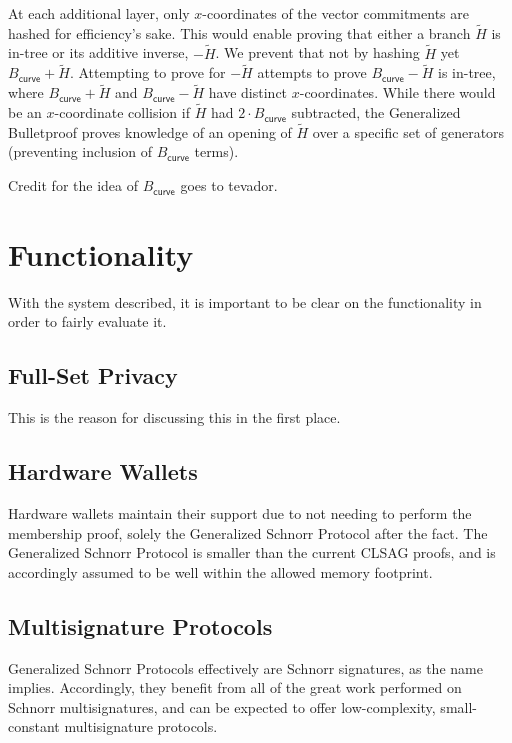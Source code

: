\documentclass[]{article}
\begin{document}
At each additional layer, only $x$-coordinates of the vector commitments are hashed for efficiency's sake. This would enable proving that either a branch $\tilde{H}$ is in-tree or its additive inverse, $-\tilde{H}$. We prevent that not by hashing $\tilde{H}$ yet $B_{\mathsf{curve}} + \tilde{H}$. Attempting to prove for $-\tilde{H}$ attempts to prove $B_{\mathsf{curve}} - \tilde{H}$ is in-tree, where $B_{\mathsf{curve}} + \tilde{H}$ and $B_{\mathsf{curve}} - \tilde{H}$ have distinct $x$-coordinates. While there would be an $x$-coordinate collision if $\tilde{H}$ had $2 \cdot B_{\mathsf{curve}}$ subtracted, the Generalized Bulletproof proves knowledge of an opening of $\tilde{H}$ over a specific set of generators (preventing inclusion of $B_{\mathsf{curve}}$ terms).

Credit for the idea of $B_{\mathsf{curve}}$ goes to tevador.

\section{Functionality}

With the system described, it is important to be clear on the functionality in order to fairly evaluate it.

\subsection{Full-Set Privacy}

This is the reason for discussing this in the first place.

\subsection{Hardware Wallets}

Hardware wallets maintain their support due to not needing to perform the membership proof, solely the Generalized Schnorr Protocol after the fact. The Generalized Schnorr Protocol is smaller than the current CLSAG proofs, and is accordingly assumed to be well within the allowed memory footprint.

\subsection{Multisignature Protocols}

Generalized Schnorr Protocols effectively are Schnorr signatures, as the name implies. Accordingly, they benefit from all of the great work performed on Schnorr multisignatures, and can be expected to offer low-complexity, small-constant multisignature protocols.
\end{document}
